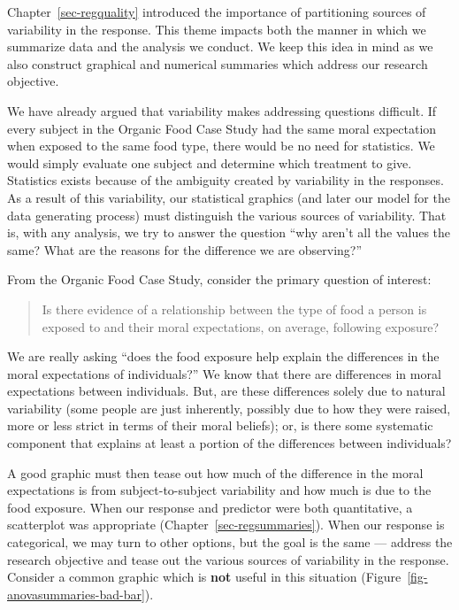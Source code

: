 \documentclass[
  letterpaper,
  DIV=11,
  numbers=noendperiod]{scrreprt}
\theoremstyle{plain}
\theoremstyle{definition}
\theoremstyle{definition}
\theoremstyle{remark}
\begin{document}
Chapter~\ref{sec-regquality} introduced the importance of partitioning
sources of variability in the response. This theme impacts both the
manner in which we summarize data and the analysis we conduct. We keep
this idea in mind as we also construct graphical and numerical summaries
which address our research objective.

We have already argued that variability makes addressing questions
difficult. If every subject in the Organic Food Case Study had the same
moral expectation when exposed to the same food type, there would be no
need for statistics. We would simply evaluate one subject and determine
which treatment to give. Statistics exists because of the ambiguity
created by variability in the responses. As a result of this
variability, our statistical graphics (and later our model for the data
generating process) must distinguish the various sources of variability.
That is, with any analysis, we try to answer the question ``why aren't
all the values the same? What are the reasons for the difference we are
observing?''

From the Organic Food Case Study, consider the primary question of
interest:

\begin{quote}
Is there evidence of a relationship between the type of food a person is
exposed to and their moral expectations, on average, following exposure?
\end{quote}

We are really asking ``does the food exposure help explain the
differences in the moral expectations of individuals?'' We know that
there are differences in moral expectations between individuals. But,
are these differences solely due to natural variability (some people are
just inherently, possibly due to how they were raised, more or less
strict in terms of their moral beliefs); or, is there some systematic
component that explains at least a portion of the differences between
individuals?

A good graphic must then tease out how much of the difference in the
moral expectations is from subject-to-subject variability and how much
is due to the food exposure. When our response and predictor were both
quantitative, a scatterplot was appropriate
(Chapter~\ref{sec-regsummaries}). When our response is categorical, we
may turn to other options, but the goal is the same --- address the
research objective and tease out the various sources of variability in
the response. Consider a common graphic which is \textbf{not} useful in
this situation (Figure~\ref{fig-anovasummaries-bad-bar}).
\end{document}
